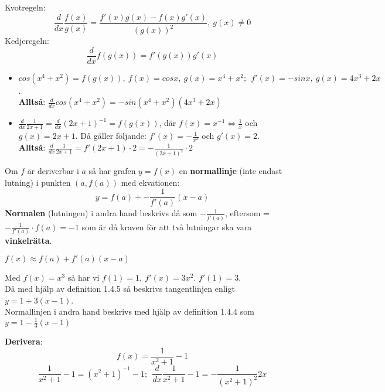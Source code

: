 \documentclass{report}
\begin{document}
\vspace{20pt}
\noindent
Kvotregeln:
\begin{equation*}
\frac{d}{dx} \frac{f(x)}{g(x)} = \frac{f'(x)g(x)-f(x)g'(x)}{(g(x))^2},\: g(x) \ne 0 
\end{equation*}
Kedjeregeln:
\begin{equation*}
\frac{d}{dx} f(g(x)) = f'(g(x))g'(x)
\end{equation*}

{
\begin{itemize}
	\item $ cos(x^4+x^2) = f(g(x)),\:f(x) = cosx,\:g(x) = x^4+x^2;\:\:f'(x) = -sinx,\:g(x) = 4x^3+2x$.\\ \textbf{Alltså}: $ \frac{d}{dx} cos(x^4+x^2) = -sin(x^4+x^2)(4x^3+2x) $
	\item $ \frac{d}{dx} \frac{1}{2x+1} = \frac{d}{dx} (2x+1)^{-1} = f(g(x)) $, där $ f(x) = x^{-1} \iff \frac{1}{x} $ och $ g(x) = 2x+1$. Då gäller följande: $ f'(x) = -\frac{1}{x^2}  $ och $ g'(x) = 2 $.\\ \textbf{Alltså}: $ \frac{d}{dx} \frac{1}{2x+1} = f'(2x+1) \cdot 2 = - \frac{1}{(2x+1)^2} \cdot 2 $     


\end{itemize}
}

{
Om $ f $ är deriverbar i $ a $ så har grafen $ y=f(x) $ en \textbf{normallinje} (inte endast lutning)  i punkten $ (a,f(a)) $ med ekvationen: 
\begin{equation*}
y = f(a) + - \frac{1}{f'(a)} (x-a)
\end{equation*}
\textbf{Normalen} (lutningen) i andra hand beskrivs då som $ - \frac{1}{f'(a)}  $, eftersom = $ - \frac{1}{f'(a)} \cdot f(a) = -1 $ som är då kraven för att två lutningar ska vara \textbf{vinkelrätta}. 
}

\vspace{20pt}
{
$ f(x) \approx f(a) + f'(a)(x-a) $
}

{
Med $ f(x) =x^3 $ så har vi $ f(1) = 1,\:f'(x) = 3x^2 $. $ f'(1) = 3  $.\\
Då med hjälp av definition 1.4.5 så beskrivs tangentlinjen enligt $ y = 1+3(x-1) $.
\\Normallinjen i andra hand beskrivs med hjälp av definition 1.4.4 som $ y=1- \frac{1}{3} (x-1) $ 
}

\vspace{20pt}
\qs{}
{
\textbf{Derivera}:
\begin{equation*}
	f(x) = \frac{1}{x^2+1} -1 
\end{equation*}
}
\sol
\begin{equation*}
	\frac{1}{x^2+1}-1 = (x^2+1)^{-1}-1;\:\: \frac{d}{dx} \frac{1}{x^2+1} -1 = - \frac{1}{(x^2+1)^2}2x
\end{equation*}
\end{document}
